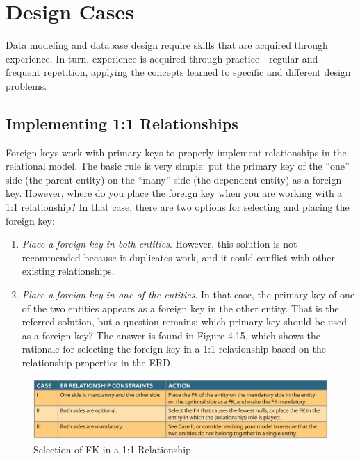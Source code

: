 \documentclass[a4paper, 12pt, titlepage]{report}
\begin{document}
{\section{Design Cases}
Data modeling and database design require skills that are acquired through experience. In turn, experience is acquired through practice—regular and frequent repetition, applying the concepts learned to specific and different design problems.
\subsection{Implementing 1:1 Relationships}
Foreign keys work with primary keys to properly implement relationships in the relational model. The basic rule is very simple: put the primary key of the “one” side (the
parent entity) on the “many” side (the dependent entity) as a foreign key. However, where do you place the foreign key when you are working with a 1:1 relationship? In that case, there are two options for selecting and placing the foreign key:
\begin{enumerate}
\item \emph{Place a foreign key in both entities}. However, this solution is not recommended because it duplicates work, and it could conflict with other existing relationships.
\item \emph{Place a foreign key in one of the entities}. In that case, the primary key of one of the two entities appears as a foreign key in the other entity. That is the referred solution, but a question remains: which primary key should be used as a foreign key? The answer is found in Figure 4.15, which shows the rationale for selecting the foreign key in a 1:1 relationship based on the relationship properties in the ERD.
\end{enumerate}
\begin{figure}[H]
\centering
\includegraphics[scale=0.5]{one2one}
\caption{Selection of FK in a 1:1 Relationship}
\end{figure}
}
\end{document}

